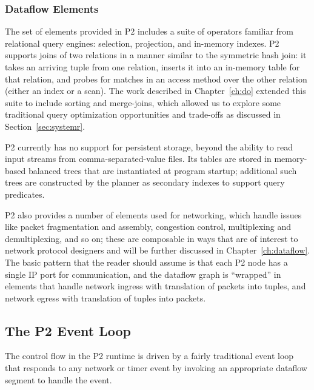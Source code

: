 \subsubsection{Dataflow Elements}
The set of elements provided in P2 includes a suite of operators familiar from relational query engines: selection, projection, and in-memory indexes.  P2 supports joins of two relations in a manner similar to the symmetric hash join: it takes an arriving tuple from one relation, inserts it into an in-memory table for that relation, and probes for matches in an access method over the other relation (either an index or a scan).  
The work described in Chapter~\ref{ch:do} extended this suite to include sorting and merge-joins, which allowed us to explore some traditional query optimization opportunities and trade-offs as discussed in Section~\ref{sec:systemr}.

P2 currently has no support for persistent storage, beyond the ability to read input streams from comma-separated-value files.  Its tables are stored in memory-based balanced trees that are instantiated at program startup; additional such trees are constructed by the planner as secondary indexes to support query predicates.

P2 also provides a number of elements used for networking, which handle issues like packet fragmentation and assembly, congestion control, multiplexing and demultiplexing, and so on; these are composable in ways that are of interest to network protocol designers and will be further discussed in Chapter~\ref{ch:dataflow}. The basic pattern that the reader should assume is that each P2 node has a single IP port for communication, and the dataflow graph is ``wrapped'' in elements that handle network ingress with translation of packets into tuples, and network egress with translation of tuples into packets.

\subsection{The P2 Event Loop}
\label{sec:eventloop}
The control flow in the P2 runtime is driven by a fairly traditional event loop that responds to any network or timer event by invoking an appropriate dataflow segment to handle the event.

